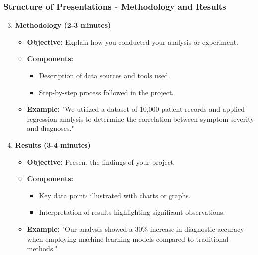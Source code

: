 \documentclass[aspectratio=169]{beamer}
\begin{document}
\begin{frame}[fragile]
    \frametitle{Structure of Presentations - Methodology and Results}
    \begin{enumerate}
        \setcounter{enumi}{2}
        \item \textbf{Methodology (2-3 minutes)}
        \begin{itemize}
            \item \textbf{Objective:} Explain how you conducted your analysis or experiment.
            \item \textbf{Components:}
            \begin{itemize}
                \item Description of data sources and tools used.
                \item Step-by-step process followed in the project.
            \end{itemize}
            \item \textbf{Example:} "We utilized a dataset of 10,000 patient records and applied regression analysis to determine the correlation between symptom severity and diagnoses."
        \end{itemize}

        \item \textbf{Results (3-4 minutes)}
        \begin{itemize}
            \item \textbf{Objective:} Present the findings of your project.
            \item \textbf{Components:}
            \begin{itemize}
                \item Key data points illustrated with charts or graphs.
                \item Interpretation of results highlighting significant observations.
            \end{itemize}
            \item \textbf{Example:} "Our analysis showed a 30\% increase in diagnostic accuracy when employing machine learning models compared to traditional methods."
        \end{itemize}
    \end{enumerate}
\end{frame}
\end{document}
